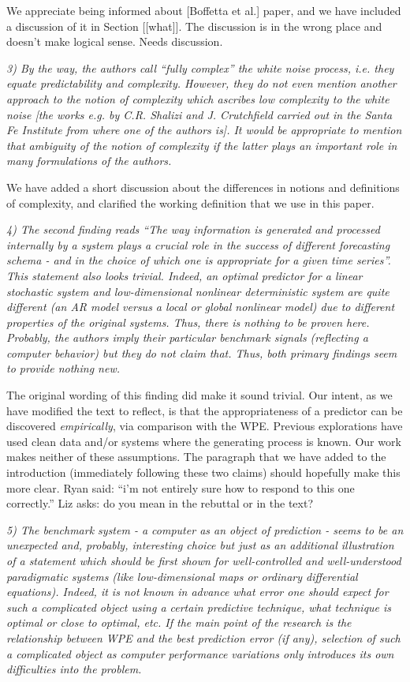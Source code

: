 \documentclass[12pt]{article}
\newcommand{\alert}[1]{{\color{red}#1}}
\begin{document}
\alert{We appreciate being informed about [Boffetta et al.]  paper,
  and we have included a discussion of it in \alert{Section [[what]].
    The discussion is in the wrong place and doesn't make logical
    sense.  Needs discussion.}

\emph{3) By the way, the authors call ``fully complex'' the white
  noise process, i.e. they equate predictability and
  complexity. However, they do not even mention another approach to
  the notion of complexity which ascribes low complexity to the white
  noise [the works e.g. by C.R. Shalizi and J. Crutchfield carried out
    in the Santa Fe Institute from where one of the authors is]. It
  would be appropriate to mention that ambiguity of the notion of
  complexity if the latter plays an important role in many
  formulations of the authors.}

We have added a short discussion about the differences in notions and
definitions of complexity, and clarified the working definition that
we use in this paper.

\emph{4) The second finding reads ``The way information is generated
  and processed internally by a system plays a crucial role in the
  success of different forecasting schema - and in the choice of which
  one is appropriate for a given time series''. This statement also
  looks trivial. Indeed, an optimal predictor for a linear stochastic
  system and low-dimensional nonlinear deterministic system are quite
  different (an AR model versus a local or global nonlinear model) due
  to different properties of the original systems. Thus, there is
  nothing to be proven here. Probably, the authors imply their
  particular benchmark signals (reflecting a computer behavior) but
  they do not claim that.  Thus, both primary findings seem to provide
  nothing new.}

The original wording of this finding did make it sound trivial.  Our
intent, as we have modified the text to reflect, is that the
appropriateness of a predictor can be discovered \emph{empirically},
via comparison with the WPE.  Previous explorations have used clean
data and/or systems where the generating process is known.  Our work
makes neither of these assumptions.  The paragraph that we have added
to the introduction (immediately following these two claims) should
hopefully make this more clear.  \alert{Ryan said: ``i'm not entirely
  sure how to respond to this one correctly.''  Liz asks: do you mean
  in the rebuttal or in the text?}

\emph{5) The benchmark system - a computer as an object of prediction
  - seems to be an unexpected and, probably, interesting choice but
  just as an additional illustration of a statement which should be
  first shown for well-controlled and well-understood paradigmatic
  systems (like low-dimensional maps or ordinary differential
  equations). Indeed, it is not known in advance what error one should
  expect for such a complicated object using a certain predictive
  technique, what technique is optimal or close to optimal, etc. If
  the main point of the research is the relationship between WPE and
  the best prediction error (if any), selection of such a complicated
  object as computer performance variations only introduces its own
  difficulties into the problem.}

}
\end{document}
